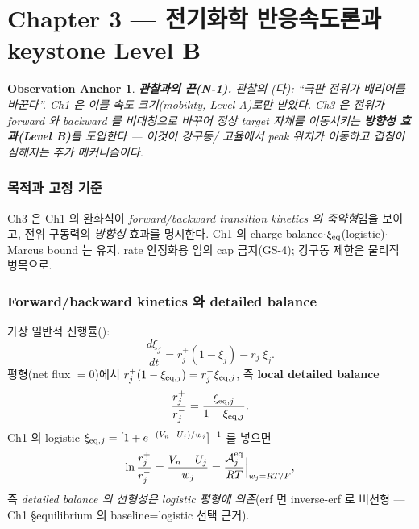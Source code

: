 \documentclass[11pt,a4paper]{article}
\newtheorem*{anchorbox}{Observation Anchor}
\begin{document}
\part*{Chapter 3 — 전기화학 반응속도론과 keystone Level B}
\setcounter{section}{0}

\begin{anchorbox}
\textbf{관찰과의 끈(N-1).} 관찰의 (다): ``극판 전위가 배리어를 바꾼다''. Ch1 은 이를 \emph{속도
크기}(mobility, Level A)로만 받았다. Ch3 은 전위가 \emph{forward 와 backward 를 비대칭}으로 바꾸어
\emph{정상 target 자체를 이동}시키는 \textbf{방향성 효과(Level B)}를 도입한다 — 이것이 강구동/
고율에서 peak 위치가 이동하고 겹침이 심해지는 추가 메커니즘이다.
\end{anchorbox}

\section{목적과 고정 기준}\label{sec:ch3_scope}
Ch3 은 Ch1 의 완화식이 \emph{forward/backward transition kinetics 의 축약형}임을 보이고, 전위
구동력의 \emph{방향성} 효과를 명시한다. Ch1 의 charge-balance$\cdot$$\xi_{\mathrm{eq}}$(logistic)$\cdot$
Marcus bound 는 유지. rate 안정화용 임의 cap 금지(GS-4); 강구동 제한은 물리적 병목으로.

\section{Forward/backward kinetics 와 detailed balance}\label{sec:ch3_fb}
가장 일반적 진행률():
\begin{equation}
\frac{d\xi_j}{dt}=r_j^+(1-\xi_j)-r_j^-\xi_j .
\label{eq:ch3_fb}
\end{equation}
평형(net flux $=0$)에서 $r_j^+(1-\xi_{\mathrm{eq},j})=r_j^-\xi_{\mathrm{eq},j}$, 즉 \textbf{local detailed balance}
\begin{equation}
\frac{r_j^+}{r_j^-}=\frac{\xi_{\mathrm{eq},j}}{1-\xi_{\mathrm{eq},j}} .
\label{eq:ch3_db}
\end{equation}
Ch1 의 logistic $\xi_{\mathrm{eq},j}=[1+e^{-(V_n-U_j)/w_j}]^{-1}$ 를 넣으면
\begin{equation}
\ln\frac{r_j^+}{r_j^-}=\frac{V_n-U_j}{w_j}=\frac{\mathcal A_j^{\mathrm{eq}}}{RT}\Big|_{w_j=RT/F},
\label{eq:ch3_dbwidth}
\end{equation}
즉 \emph{detailed balance 의 선형성은 logistic 평형에 의존}(erf 면 inverse-erf 로 비선형 — Ch1
\S equilibrium 의 baseline=logistic 선택 근거).
\end{document}
